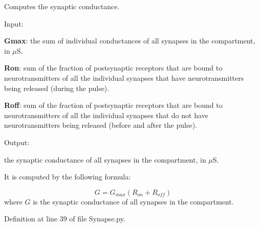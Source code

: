 Computes the synaptic conductance. 


\begin{DoxyItemize}
\item Input\-:
\begin{DoxyItemize}
\item {\bfseries Gmax}\-: the sum of individual conductances of all synapses in the compartment, in $\mu$S.
\item {\bfseries Ron}\-: sum of the fraction of postsynaptic receptors that are bound to neurotransmitters of all the individual synapses that have neurotransmitters being released (during the pulse).
\item {\bfseries Roff}\-: sum of the fraction of postsynaptic receptors that are bound to neurotransmitters of all the individual synapses that do not have neurotransmitters being released (before and after the pulse).
\end{DoxyItemize}
\item Output\-:
\begin{DoxyItemize}
\item the synaptic conductance of all synapses in the compartment, in $\mu$S.
\end{DoxyItemize}
\end{DoxyItemize}

It is computed by the following formula\-:

\begin{equation} G = G_{max}(R_{on} + R_{off}) \end{equation} where $G$ is the synaptic conductance of all synapses in the compartment. 

Definition at line 39 of file Synapse.\-py.

